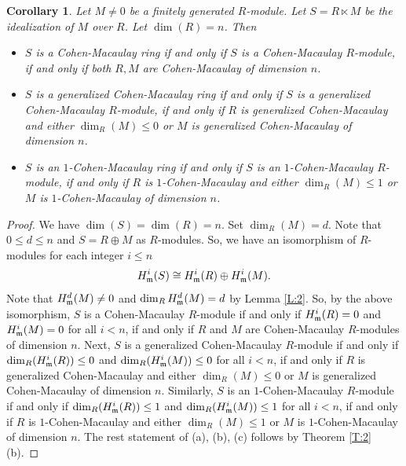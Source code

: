 \documentclass[a4papersize]{article}
\newtheorem{corollary}[theorem]{Corollary}
\begin{document}
{\begin{corollary} \label{C:1}  Let $M\neq 0$ be a finitely generated $R$-module. Let $S=R\ltimes M$ be the idealization of $M$ over $R$. Let $\dim (R)=n$. Then   
\begin{itemize}
\item[\rm{(a)}] $S$ is a Cohen-Macaulay ring if and only if $S$ is a Cohen-Macaulay $R$-module, if and only if   both $R, M$ are Cohen-Macaulay of dimension $n$.
				
\item[\rm{(b)}] $S$ is a generalized Cohen-Macaulay ring if and only if $S$ is a generalized Cohen-Macaulay $R$-module, if and only if  $R$ is generalized Cohen-Macaulay and either $\dim_R(M)\leq 0$ or  $M$ is generalized Cohen-Macaulay of dimension $n$.
				
\item[\rm{(c)}] $S$ is an $1$-Cohen-Macaulay ring if and only if $S$ is an $1$-Cohen-Macaulay $R$-module, if and only if  $R$ is $1$-Cohen-Macaulay and either $\dim_R(M)\leq 1$ or  $M$ is $1$-Cohen-Macaulay of dimension $n$. 							
\end{itemize}
\end{corollary}
		
\begin{proof} We have $\dim(S)=\dim(R)=n$. Set $\dim_R(M)=d.$ Note that $0\leq d\leq n$ and  $S=R\oplus M$ as $R$-modules.  So, we have  an isomorphism of $R$-modules for each integer $i\leq n$ $$H_{\frak m}^i(S)\cong H^i_{\frak m}(R)\oplus H^i_{\frak m}(M).$$ 	
 Note that $H^d_{\frak m}(M)\neq 0$ and $\dim_RH^d_{\frak m}(M)=d$ by Lemma \ref{L:2}. So,  by the above isomorphism, $S$ is a Cohen-Macaulay $R$-module if and only if $H^i_{\frak m}(R)=0$ and $H^i_{\frak m}(M)=0$ for all $i<n$, if and only if  $R$ and $ M$ are Cohen-Macaulay $R$-modules of dimension $n$. Next, $S$ is a generalized Cohen-Macaulay  $R$-module if and only if $\dim_R(H^i_{\frak m}(R))\leq 0$ and $\dim_R(H^i_{\frak m}(M))\leq 0$  for all $i<n$, if and only if $R$ is generalized Cohen-Macaulay  and either $\dim_R(M)\leq 0$ or  $M$ is generalized Cohen-Macaulay of dimension $n$. Similarly,  
  $S$ is an $1$-Cohen-Macaulay $R$-module if and only if  $\dim_R(H^i_{\frak m}(R))\leq 1$ and $\dim_R(H^i_{\frak m}(M))\leq 1$ for all $i<n$, if and only if $R$ is $1$-Cohen-Macaulay and either  $\dim_R(M)\leq 1$ or  $M$ is $1$-Cohen-Macaulay  of dimension $n$. The rest  statement of (a), (b), (c) follows by  Theorem \ref{T:2}(b). 
\end{proof}

}
\end{document}
